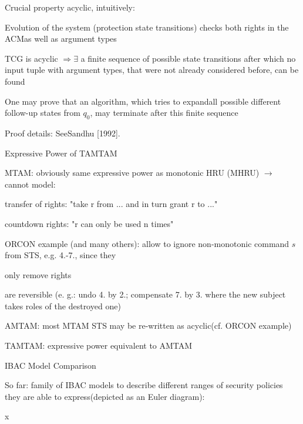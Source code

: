 \documentclass[a4paper]{article}
\begin{document}
\begin{multicols}{3}
    \begin{itemize*}
        \item Crucial property acyclic, intuitively:
        \begin{itemize*}
            \item Evolution of the system (protection state transitions) checks both rights in the ACMas well as argument types
            \item TCG is acyclic $\Rightarrow\exists$ a finite sequence of possible state transitions after which no input tuple with argument types, that were not already considered before, can be found
            \item One may prove that an algorithm, which tries to expandall possible different follow-up states from $q_0$, may terminate after this finite sequence
            \item Proof details: SeeSandhu [1992].
        \end{itemize*}
    \end{itemize*}

    Expressive Power of TAMTAM
    \begin{itemize*}
        \item MTAM: obviously same expressive power as monotonic HRU (MHRU) $\rightarrow$  cannot model:
        \begin{itemize*}
            \item transfer of rights: "take r from ... and in turn grant r to ..."
            \item countdown rights: "r can only be used n times"
        \end{itemize*}
        \item ORCON example (and many others): allow to ignore non-monotonic command $s$ from STS, e.g. 4.-7., since they
        \begin{itemize*}
            \item only remove rights
            \item are reversible (e. g.: undo 4. by 2.; compensate 7. by 3. where the new subject takes roles of the destroyed one)
        \end{itemize*}
        \item AMTAM: most MTAM STS may be re-written as acyclic(cf. ORCON example)
        \item TAMTAM: expressive power equivalent to AMTAM
    \end{itemize*}

    IBAC Model Comparison
    \begin{itemize*}
        \item So far: family of IBAC models to describe different ranges of security policies they are able to express(depicted as an Euler diagram):
        \item x%
    \end{itemize*}


\end{multicols}
\end{document}
